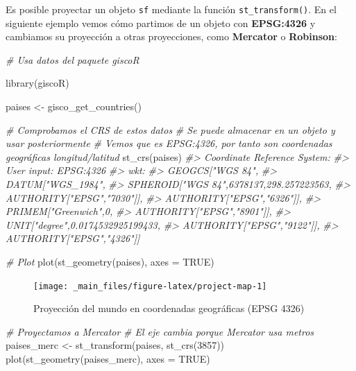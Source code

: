 \documentclass[
]{book}
\newenvironment{Shaded}{\begin{snugshade}}{\end{snugshade}}
\newcommand{\AttributeTok}[1]{\textcolor[rgb]{0.77,0.63,0.00}{#1}}
\newcommand{\CommentTok}[1]{\textcolor[rgb]{0.56,0.35,0.01}{\textit{#1}}}
\newcommand{\ConstantTok}[1]{\textcolor[rgb]{0.00,0.00,0.00}{#1}}
\newcommand{\DecValTok}[1]{\textcolor[rgb]{0.00,0.00,0.81}{#1}}
\newcommand{\FunctionTok}[1]{\textcolor[rgb]{0.00,0.00,0.00}{#1}}
\newcommand{\NormalTok}[1]{#1}
\newcommand{\OtherTok}[1]{\textcolor[rgb]{0.56,0.35,0.01}{#1}}
\begin{document}
Es posible proyectar un objeto \texttt{sf} mediante la función \texttt{st\_transform()}. En el
siguiente ejemplo vemos cómo partimos de un objeto con \textbf{EPSG:4326} y cambiamos
su proyección a otras proyecciones, como \textbf{Mercator} o \textbf{Robinson}:

\begin{Shaded}
\begin{Highlighting}[]

\CommentTok{\# Usa datos del paquete giscoR}

\FunctionTok{library}\NormalTok{(giscoR)}

\NormalTok{paises }\OtherTok{\textless{}{-}} \FunctionTok{gisco\_get\_countries}\NormalTok{()}

\CommentTok{\# Comprobamos el CRS de estos datos}
\CommentTok{\# Se puede almacenar en un objeto y usar posteriormente}
\CommentTok{\# Vemos que es EPSG:4326, por tanto son coordenadas geográficas longitud/latitud}
\FunctionTok{st\_crs}\NormalTok{(paises)}
\CommentTok{\#\textgreater{} Coordinate Reference System:}
\CommentTok{\#\textgreater{}   User input: EPSG:4326 }
\CommentTok{\#\textgreater{}   wkt:}
\CommentTok{\#\textgreater{} GEOGCS["WGS 84",}
\CommentTok{\#\textgreater{}     DATUM["WGS\_1984",}
\CommentTok{\#\textgreater{}         SPHEROID["WGS 84",6378137,298.257223563,}
\CommentTok{\#\textgreater{}             AUTHORITY["EPSG","7030"]],}
\CommentTok{\#\textgreater{}         AUTHORITY["EPSG","6326"]],}
\CommentTok{\#\textgreater{}     PRIMEM["Greenwich",0,}
\CommentTok{\#\textgreater{}         AUTHORITY["EPSG","8901"]],}
\CommentTok{\#\textgreater{}     UNIT["degree",0.0174532925199433,}
\CommentTok{\#\textgreater{}         AUTHORITY["EPSG","9122"]],}
\CommentTok{\#\textgreater{}     AUTHORITY["EPSG","4326"]]}

\CommentTok{\# Plot}
\FunctionTok{plot}\NormalTok{(}\FunctionTok{st\_geometry}\NormalTok{(paises), }\AttributeTok{axes =} \ConstantTok{TRUE}\NormalTok{)}
\end{Highlighting}
\end{Shaded}

\begin{figure}

{\centering \texttt{[image: \_main\_files/figure-latex/project-map-1]} 

}

\caption{Proyección del mundo en coordenadas geográficas (EPSG 4326)}\label{fig:project-map-1}
\end{figure}

\begin{Shaded}
\begin{Highlighting}[]

\CommentTok{\# Proyectamos a Mercator}
\CommentTok{\# El eje cambia porque Mercator usa metros}
\NormalTok{paises\_merc }\OtherTok{\textless{}{-}} \FunctionTok{st\_transform}\NormalTok{(paises, }\FunctionTok{st\_crs}\NormalTok{(}\DecValTok{3857}\NormalTok{))}
\FunctionTok{plot}\NormalTok{(}\FunctionTok{st\_geometry}\NormalTok{(paises\_merc), }\AttributeTok{axes =} \ConstantTok{TRUE}\NormalTok{)}
\end{Highlighting}
\end{Shaded}
\end{document}

